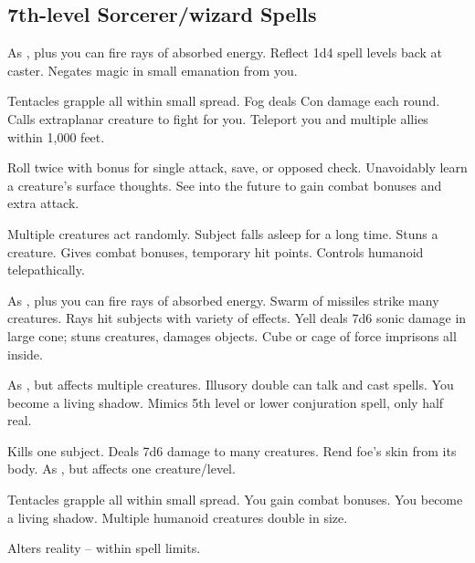 \subsection{7th-level Sorcerer/wizard Spells}
\begin{swspelllist}
   As , plus you can fire rays of absorbed energy.
   Reflect 1d4 spell levels back at caster.
   Negates magic in small emanation from you.

   Tentacles grapple all within small spread.
   Fog deals Con damage each round.
   Calls extraplanar creature to fight for you.
   Teleport you and multiple allies within 1,000 feet.

   Roll twice with bonus for single attack, save, or opposed check.
   Unavoidably learn a creature's surface thoughts.
   See into the future to gain combat bonuses and extra attack.

   Multiple creatures act randomly.
   Subject falls asleep for a long time.
   Stuns a creature.
   Gives combat bonuses, temporary hit points.
   Controls humanoid telepathically.

   As , plus you can fire rays of absorbed energy.
   Swarm of missiles strike many creatures.
   Rays hit subjects with variety of effects.
   Yell deals 7d6 sonic damage in large cone; stuns creatures, damages objects.
  \M Cube or cage of force imprisons all inside.

   As , but affects multiple creatures.
   Illusory double can talk and cast spells.
   You become a living shadow.
   Mimics 5th level or lower conjuration spell, only half real. 

   Kills one subject.
   Deals 7d6 damage to many creatures.
   Rend foe's skin from its body.
   As , but affects one creature/level.

   Tentacles grapple all within small spread.
  \M You gain combat bonuses.
   You become a living shadow.
   Multiple humanoid creatures double in size.

  \M Alters reality -- within spell limits.
\end{swspelllist}

